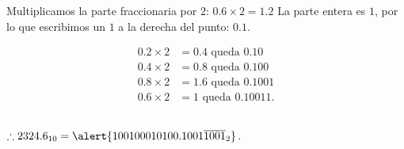 \begin{frame}
\begin{solution}
\begin{columns}[t]
\begin{column}{0.48\textwidth}
\begin{description}
						Multiplicamos la parte fraccionaria por $2$:
						$0.6\times2=1.2$
						La parte entera es $1$, por lo que escribimos un $1$ a la derecha del punto:
						$0.1$.

						\begin{align*}
							0.2 \times 2 & = 0.4  \text{ queda } 0.10     \\
							0.4 \times 2 & = 0.8  \text{ queda } 0.100    \\
							0.8 \times 2 & = 1.6  \text{ queda } 0.1001   \\
							0.6 \times 2 & = 1    \text{ queda } 0.10011.
						\end{align*}
				\end{description}
			\end{column}
		\end{columns}
		\begin{math}
			\therefore
			2324.6_{10}=
			\alert{100100010100.1001\overline{1001}_{2}}
		\end{math}.
	\end{solution}
\end{frame}